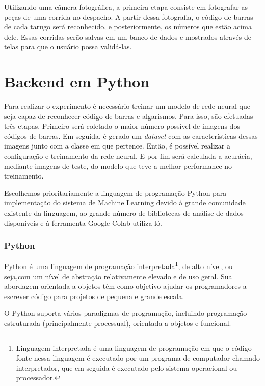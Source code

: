 Utilizando uma câmera fotográfica, a primeira etapa consiste em fotografar as peças de uma corrida no despacho. A partir dessa fotografia, o código de barras de cada tarugo será reconhecido, e posteriormente, os números que estão acima dele. Essas corridas serão salvas em um banco de dados e mostrados através de telas para que o usuário possa validá-las.


\section{Backend em Python} \label{sec:backend}

Para realizar o experimento é necessário treinar um modelo de rede neural que seja capaz de reconhecer código de barras e algarismos. Para isso, são efetuadas três etapas. Primeiro será coletado o maior número possível de imagens dos códigos de barras. Em seguida, é gerado um \textit{dataset} com as características dessas imagens junto com a classe em que pertence. Então, é possível realizar a configuração e treinamento da rede neural. E por fim será calculada a acurácia, mediante imagens de teste, do modelo que teve a melhor performance no treinamento.

Escolhemos prioritariamente a linguagem de programação Python para implementação do sistema de Machine Learning devido à grande comunidade existente da linguagem, ao grande número de bibliotecas de análise de dados disponiveis e à ferramenta Google Colab utiliza-ló.


\subsubsection*{Python}

Python é uma linguagem de programação interpretada\footnote{Linguagem interpretada é uma linguagem de programação em que o código fonte nessa linguagem é executado por um programa de computador chamado interpretador, que em seguida é executado pelo sistema operacional ou processador.}, de alto nível, ou seja,com um nível de abstração relativamente elevado e de uso geral. Sua abordagem orientada a objetos têm como objetivo ajudar os programadores a escrever código para projetos de pequena e grande escala.

O Python suporta vários paradigmas de programação, incluindo programação estruturada (principalmente processual), orientada a objetos e funcional.

